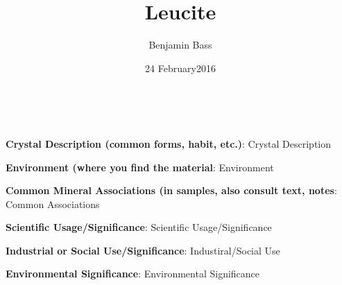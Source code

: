 \documentclass[10pt]{article}
\author{Benjamin Bass}
\date{24 February2016}
\title{\vspace{-2.0cm}Leucite} %
\begin{document}
\maketitle

\begin{center}
\end{center}


\    
\
\
\
\
\
\
\
\
\

\begin{framed}
  \textbf{Crystal Description (common forms, habit, etc.)}:  Crystal Description
\end{framed}

\begin{framed}
  \textbf{Environment (where you find the material}:  Environment
\end{framed}

\begin{framed}
  \textbf{Common Mineral Associations (in samples, also consult text, notes}:  Common Associations
\end{framed}

\begin{framed}
  \textbf{Scientific Usage/Significance}:  Scientific Usage/Significance
\end{framed}

\begin{framed}
  \textbf{Industrial or Social Use/Significance}:  Industiral/Social Use
\end{framed}

\begin{framed}
  \textbf{Environmental Significance}:  Environmental Significance
\end{framed}

\end{document}
